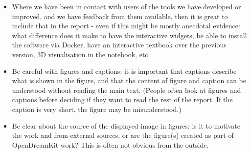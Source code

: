 \begin{itemize}
\item Where we have been in contact with users of the tools we have
developed or improved, and we have feedback from them available,
then it is great to include that in the report - even if this might
be mostly anecdotal evidence: what difference does it make to have
the interactive widgets, be able to install the software via Docker,
have an interactive textbook over the previous version, 3D
visualisation in the notebook, etc.

\item Be careful with figures and captions: it is important that captions
describe what is shown in the figure, and that the content of figure
and caption can be understood without reading the main text. (People
often look at figures and captions before deciding if they want to
read the rest of the report. If the caption is very short, the
figure may be misunderstood.)

\item Be clear about the source of the displayed image in figures: is it
to motivate the work and from external sources, or are the figure(s)
created as part of OpenDreamKit work? This is often not obvious from
the outside.
\end{itemize}













